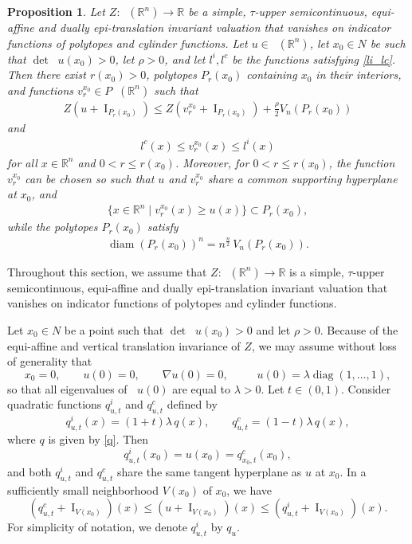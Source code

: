 \documentclass[11pt]{article}
\newtheorem{prop}[teo]{Proposition}
\theoremstyle{definition} %
\newcommand{\RR}{(\mathbb{R}^n)}
\DeclareMathOperator{\I}{I}
\DeclareMathOperator{\LQ}{_{l.q}}
\DeclareMathOperator{\D}{D^2}
\DeclareMathOperator{\diag}{diag}
\DeclareMathOperator{\LP}{Conv_{lp}}
\DeclareMathOperator{\diam}{diam}
\begin{document}
\begin{prop}\label{regularr}
Let $Z:\LP\RR\rightarrow\mathbb{R}$ be a simple, $\tau$-upper semicontinuous, equi-affine and  dually epi-translation   invariant valuation that   vanishes on  indicator functions of polytopes and cylinder functions. Let $u \in \LP(\mathbb{R}^n)$,
let $x_0\in N$ be such that $\det\D u(x_0)>0$,  let $\rho>0$, and let $l^i, l^c$  be the functions satisfying \eqref{li_lc}. Then there exist $r(x_0)>0$, 
polytopes $P_r(x_0)$ containing $x_0$ in their interiors, and  functions $v_r^{x_0}\in P\LQ\RR$ such that
\begin{align}\label{eq10.47a}
  Z(u+\I_{P_r(x_0)}) \leq Z(v_r^{x_0}+\I_{P_r(x_0)}) + \frac{\rho}{2}V_n(P_r(x_0))
\end{align}
and
\begin{align}\label{eq10.48b}
l^c(x)\leq v_r^{x_0}(x)\leq l^i(x)    
\end{align}
for all $x\in \mathbb{R}^n$ and $0<r\leq r(x_0)$. Moreover, for $0<r\leq r(x_0)$,  the function $v_r^{x_0}$ can be chosen so such that
$u$ and $v_r^{x_0}$ share a common supporting hyperplane at $x_0$, and 
\begin{align}\label{eq4111c}
 \{x\in \mathbb{R}^n\mid v_r^{x_0}(x)\geq u(x)\}   \subset P_r(x_0), 
\end{align}
while the  polytopes $P_r(x_0)$ satisfy 
\begin{align}\label{eq10.26..d}
\diam(P_r(x_0))^n= n^{\frac{n}{2}}\, V_n(P_r(x_0)).    
\end{align}
\end{prop}

Throughout this section, we assume that
$Z:\LP\RR\rightarrow\mathbb{R}$ is a simple, $\tau$-upper semicontinuous, equi-affine and dually epi-translation invariant valuation that vanishes on indicator functions of polytopes and cylinder functions.

Let $x_0\in N$ be a point such that $\det \D u(x_0)>0$ and let $\rho>0$. Because of the equi-affine and vertical translation invariance of $Z$, we may assume without loss of generality that
$$
x_0 = 0, \qquad u(0) = 0, \qquad \nabla u(0) = 0, \qquad \D u(0) = \lambda \diag(1, \dots, 1),
$$
so that all eigenvalues of $\D u(0)$ are equal to $\lambda > 0$. Let $t \in (0,1)$. 
Consider quadratic functions $q_{u,t}^i$ and $q_{u,t}^c$ defined by
$$
q_{u,t}^i(x) = (1+t)\lambda\, q(x), 
\qquad
 q_{u,t}^c = (1-t) \lambda\, q(x),
$$
where $q$ is given by \eqref{q}. Then
$$
q_{u,t}^i(x_0) = u(x_0) = q_{x_0,t}^c(x_0),
$$
and both $q_{u,t}^i$ and $q_{u,t}^c$ share the same tangent hyperplane as $u$ at $x_0$.  In a sufficiently small neighborhood $V(x_0)$ of $x_0$, we have
$$
(q_{u,t}^c  + \I_{V(x_0)})(x) 
\le (u + \I_{V(x_0)})(x) 
\le (q_{u,t}^i + \I_{V(x_0)})(x).
$$
For simplicity of notation, we  denote $q_{u,t}^i$ by $q_u$.
\end{document}
